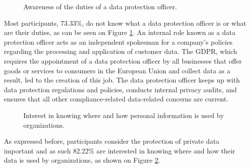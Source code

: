 
\begin{figure}[H]
    \centering
    \caption{Awareness of the duties of a data protection officer.}
    \label{fig:aware_dpo}
\end{figure}

Most participants, 73.33\%, do not know what a data protection officer is
or what are their duties, as can be seen on Figure \ref{fig:aware_dpo}.
An internal role known as a data protection officer acts as an independent
spokesman for a company's policies regarding the processing and
application of customer data. The GDPR, which requires the appointment
of a data protection officer by all businesses that offer goods or
services to consumers in the European Union and collect data as a
result, led to the creation of this job. The data protection officer
keeps up with data protection regulations and policies, conducts
internal privacy audits, and ensures that all other compliance-related
data-related concerns are current.

\begin{figure}
    \centering
    \caption{Interest in knowing where and how personal information is used by organizations.}
    \label{fig:interested_where_how_information_used}
\end{figure}

As expressed before, participants consider the protection of private data important
and as such 82.22\% are interested in knowing where and how their data is used by
organizations, as shown on Figure \ref{fig:interested_where_how_information_used}.

